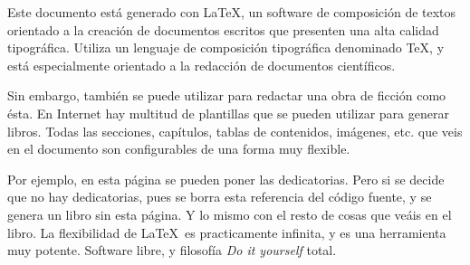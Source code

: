 Este documento está generado con \LaTeX, un software de composición de textos orientado a la creación de documentos escritos que presenten una alta calidad tipográfica. Utiliza un lenguaje de composición tipográfica denominado \TeX, y está especialmente orientado a la redacción de documentos científicos.

Sin embargo, también se puede utilizar para redactar una obra de ficción como ésta. En Internet hay multitud de plantillas que se pueden utilizar para generar libros. Todas las secciones, capítulos, tablas de contenidos, imágenes, etc. que veis en el documento son configurables de una forma muy flexible.

Por ejemplo, en esta página se pueden poner las dedicatorias. Pero si se decide que no hay dedicatorias, pues se borra esta referencia del código fuente, y se genera un libro sin esta página. Y lo mismo con el resto de cosas que veáis en el libro. La flexibilidad de \LaTeX\ es practicamente infinita, y es una herramienta muy potente. Software libre, y filosofía \emph{Do it yourself} total.